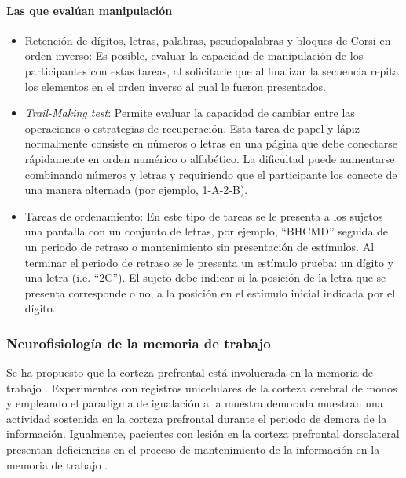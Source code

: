 \documentclass[12pt,letterpaper,final]{article}
\let\cite\cite %
\begin{document}
\paragraph*{Las que evalúan manipulación}
\begin{itemize}


	\item Retención de dígitos, letras, palabras, pseudopalabras y bloques de Corsi en orden inverso:
	Es posible, evaluar la capacidad de manipulación de los participantes con estas tareas, al solicitarle que al finalizar la secuencia repita los elementos en el orden inverso al cual le fueron presentados.

	\item \textit{Trail-Making test}:
	Permite evaluar la capacidad de cambiar entre las operaciones o estrategias de recuperación. Esta tarea de papel y lápiz normalmente consiste en números o letras en una página que debe conectarse rápidamente en orden numérico o alfabético. La dificultad puede aumentarse combinando números y letras y requiriendo que el participante los conecte de una manera alternada (por ejemplo, 1-A-2-B).

	\item Tareas de ordenamiento:
	En este tipo de tareas se le presenta a los sujetos una pantalla con un conjunto de letras, por ejemplo, “BHCMD” seguida de un periodo de retraso o mantenimiento sin presentación de estímulos. Al terminar el periodo de retraso se le presenta un estímulo prueba: un dígito y una letra (i.e. “2C”). El sujeto debe indicar si la posición de la letra que se presenta corresponde o no, a la posición en el estímulo inicial indicada por el dígito.

\end{itemize}


\subsubsection{Neurofisiología de la memoria de trabajo}

Se ha propuesto que la corteza prefrontal está involucrada en la memoria de trabajo \cite{DEsposito1999,Liu2010}. Experimentos con registros unicelulares de la corteza cerebral de monos y empleando el paradigma de igualación a la muestra demorada \cite{Funahashi1989} muestran una actividad sostenida en la corteza prefrontal durante el periodo de demora de la información. Igualmente, pacientes con lesión en la corteza prefrontal dorsolateral presentan deficiencias en el proceso de mantenimiento de la información en la memoria de trabajo \cite{Eriksson2015}.
\end{document}
